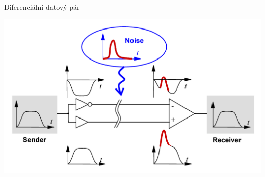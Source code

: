 \documentclass[aspectratio=43]{beamer}
\begin{document}
\begin{frame}{Diferenciální datový pár}
	 
	\begin{center}
		\includegraphics[width=1\linewidth]{extrahovane_obrazky/diff.png}
	\end{center}
	
\end{frame}
\end{document}
